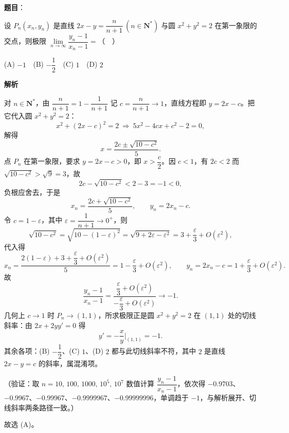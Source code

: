 \begin{answer}

\textbf{题目}：

设 \(P_{n}(x_{n},y_{n})\) 是直线 \(2x-y=\dfrac{n}{n+1}\ (n\in\mathbf{N}^{*})\) 与圆 \(x^{2}+y^{2}=2\) 在第一象限的交点，则极限 \(\lim\limits_{n\to\infty}\dfrac{y_{n}-1}{x_{n}-1}=\)（　）

(A) \(-1\)　(B) \(-\dfrac{1}{2}\)　(C) \(1\)　(D) \(2\)

\textbf{解析}

对 \(n\in\mathbf{N}^{*}\)，由 \(\dfrac{n}{n+1}=1-\dfrac{1}{n+1}\) 记 \(c=\dfrac{n}{n+1}\to1\)，直线方程即 \(y=2x-c\)。把它代入圆 \(x^{2}+y^{2}=2\)：
\nopagebreak[4]
\[
x^{2}+(2x-c)^{2}=2\ \Longrightarrow\ 5x^{2}-4cx+c^{2}-2=0,
\]
解得
\nopagebreak[4]
\[
x=\frac{2c\pm\sqrt{10-c^{2}}}{5}.
\]
点 \(P_{n}\) 在第一象限，要求 \(y=2x-c>0\)，即 \(x>\dfrac{c}{2}\)。因 \(c<1\)，有 \(2c<2\) 而 \(\sqrt{10-c^{2}}>\sqrt{9}=3\)，故
\nopagebreak[4]
\[
2c-\sqrt{10-c^{2}}<2-3=-1<0,
\]
负根应舍去，于是
\nopagebreak[4]
\[
x_{n}=\frac{2c+\sqrt{10-c^{2}}}{5},\qquad y_{n}=2x_{n}-c.
\]
令 \(c=1-\varepsilon\)，其中 \(\varepsilon=\dfrac{1}{n+1}\to0^{+}\)，则
\nopagebreak[4]
\[
\sqrt{10-c^{2}}=\sqrt{10-(1-\varepsilon)^{2}}=\sqrt{9+2\varepsilon-\varepsilon^{2}}=3+\frac{\varepsilon}{3}+O(\varepsilon^{2}),
\]
代入得
\nopagebreak[4]
\[
x_{n}=\frac{2(1-\varepsilon)+3+\dfrac{\varepsilon}{3}+O(\varepsilon^{2})}{5}=1-\frac{\varepsilon}{3}+O(\varepsilon^{2}),\qquad
y_{n}=2x_{n}-c=1+\frac{\varepsilon}{3}+O(\varepsilon^{2}).
\]
故
\nopagebreak[4]
\[
\frac{y_{n}-1}{x_{n}-1}=\frac{\dfrac{\varepsilon}{3}+O(\varepsilon^{2})}{-\dfrac{\varepsilon}{3}+O(\varepsilon^{2})}\to-1.
\]
几何上 \(c\to1\) 时 \(P_{n}\to(1,1)\)，所求极限正是圆 \(x^{2}+y^{2}=2\) 在 \((1,1)\) 处的切线斜率：由 \(2x+2yy'=0\) 得
\nopagebreak[4]
\[
y'=-\frac{x}{y}\Big|_{(1,1)}=-1.
\]
其余各项：(B) \(-\dfrac{1}{2}\)、(C) \(1\)、(D) \(2\) 都与此切线斜率不符，其中 \(2\) 是直线 \(2x-y=c\) 的斜率，属混淆项。

（验证：取 \(n=10,\,100,\,1000,\,10^{5},\,10^{7}\) 数值计算 \(\dfrac{y_{n}-1}{x_{n}-1}\)，依次得 \(-0.9703\)、\(-0.9967\)、\(-0.99967\)、\(-0.9999967\)、\(-0.99999996\)，单调趋于 \(-1\)，与解析展开、切线斜率两条路径一致。）

故选 (A)。


\end{answer}
